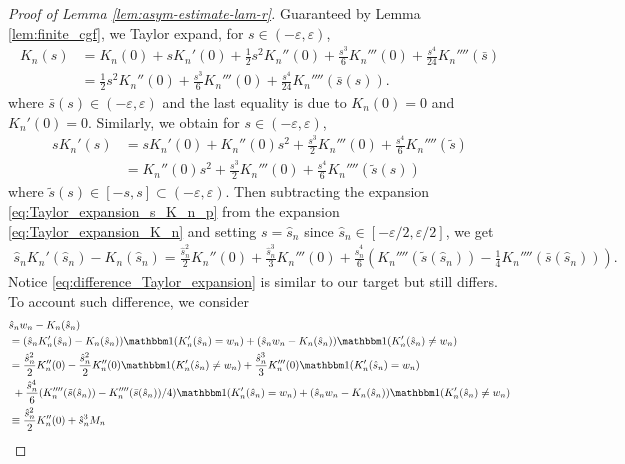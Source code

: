 \documentclass[12pt]{article}
\theoremstyle{definition}
\newcommand{\indicator}{\mathbbm 1}						%
\begin{document}
\begin{proof}[Proof of Lemma \ref{lem:asym-estimate-lam-r}]
	Guaranteed by Lemma \ref{lem:finite_cgf}, we Taylor expand, for $s\in (-\varepsilon,\varepsilon)$,
	\begin{align}
	  K_n(s)
	  &\nonumber
	  =K_n(0)+ sK_n'(0)+\frac{1}{2}s^2
	  K_n''(0)+\frac{s^3}{6}K_n'''(0)+\frac{s^4}{24}K_n''''(\bar s)\\
	  &\label{eq:Taylor_expansion_K_n}
	  =\frac{1}{2}s^2
	  K_n''(0)+\frac{s^3}{6}K_n'''(0)+\frac{s^4}{24}K_n''''(\bar s(s)).
	\end{align}
	where $\bar s(s)\in (-\varepsilon,\varepsilon)$ and the last equality is due to $K_n(0)=0$ and $K_n'(0)=0$. Similarly, we obtain for $s\in(-\varepsilon,\varepsilon)$,
	\begin{align}
		sK_n'(s)
		&\nonumber
		=sK_n'(0)+K_n''(0)s^2+\frac{s^3}{2}K_n'''(0)+\frac{s^4}{6}K_n''''(\tilde s)\\
		&\label{eq:Taylor_expansion_s_K_n_p}
		=K_n''(0)s^2+\frac{s^3}{2}K_n'''(0)+\frac{s^4}{6}K_n''''(\tilde s(s))
	\end{align}
	where $\tilde s(s)\in [-s,s]\subset (-\varepsilon,\varepsilon)$. Then subtracting the expansion \eqref{eq:Taylor_expansion_s_K_n_p} from the expansion \eqref{eq:Taylor_expansion_K_n} and setting $s=\hat s_n$ since $\hat s_n\in [-\varepsilon/2,\varepsilon/2]$, we get 
	\begin{align}\label{eq:difference_Taylor_expansion}
		\hat s_n K_n'(\hat s_n)-K_n(\hat s_n)=\frac{\hat s_n^2}{2}K_n''(0)+\frac{\hat s_n^3}{3}K_n'''(0)+\frac{\hat s_n^4}{6}\left(K_n''''(\tilde s(\hat s_n))-\frac{1}{4}K_n''''(\bar s(\hat s_n))\right).
	\end{align}
	Notice \eqref{eq:difference_Taylor_expansion} is similar to our target but still differs. To account such difference, we consider
	\begin{align}
		&\nonumber
		\hat s_n w_n -K_n(\hat s_n)\\
		&\nonumber
		=(\hat s_n K_n'(\hat s_n)-K_n(\hat s_n))\indicator(K_n'(\hat s_n)=w_n)+(\hat s_n w_n-K_n(\hat s_n))\indicator(K_n'(\hat s_n)\neq w_n)\\
		&\nonumber
		=\frac{\hat s_n^2}{2}K_n''(0)-\frac{\hat s_n^2}{2}K_n''(0)\indicator(K_n'(\hat s_n)\neq w_n)+\frac{\hat s_n^3}{3}K_n'''(0)\indicator(K_n'(\hat s_n)=w_n)\\
		&\nonumber
		\ +\frac{\hat s_n^4}{6}(K_n''''(\tilde s(\hat s_n))-K_n''''(\bar s(\hat s_n))/4)\indicator(K_n'(\hat s_n)=w_n) +(\hat s_n w_n-K_n(\hat s_n))\indicator(K_n'(\hat s_n)\neq w_n)\\
		&\label{eq:rate_r_n}
		\equiv \frac{\hat s_n^2}{2}K_n''(0)+\hat s_n^3M_n

\end{align}
\end{proof}
\end{document}
